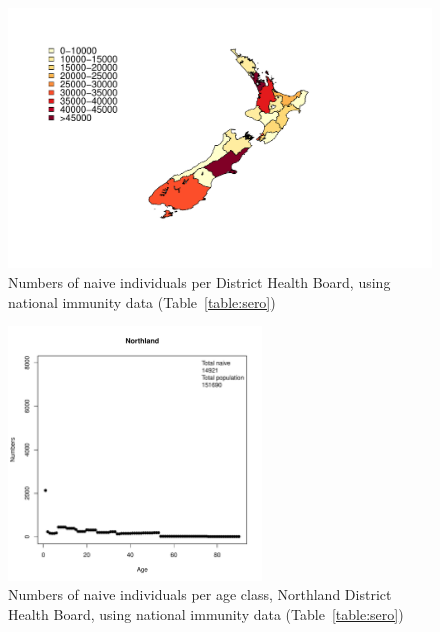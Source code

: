 \documentclass{article}
\begin{document}
\begin{figure}[H]
     \begin{center}
     \includegraphics[width=1.2\textwidth]{naive_map.pdf}
     \end{center}
     \caption{Numbers of naive individuals per District Health Board, using national immunity data (Table~\ref{table:sero})}
     \label{fig:naive_map}
\end{figure}

\begin{figure}[H]
     \begin{center}
     \includegraphics[width=0.6\textwidth]{dhb1.pdf}
     \end{center}
     \caption{Numbers of naive individuals per age class, Northland District Health Board, using national immunity data (Table~\ref{table:sero})}
     \label{fig:Northland}
\end{figure}
\end{document}
